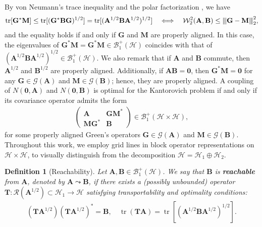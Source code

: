 \documentclass[noinfoline]{imsart}\setcounter{tocdepth}{2}
\newcommand{\m}[1]{\mathbf{#1}}
\renewcommand{\c}[1]{\mathcal{#1}}
\DeclareMathOperator{\tr}{tr}
\newcommand{\vertii}[1]{{\vert\kern-0.25ex\vert\kern-0.25ex\vert #1 
    \vert\kern-0.25ex\vert\kern-0.25ex\vert}} %
\theoremstyle{plain}
\newtheorem{definition}{Definition}[section]
\begin{document}
By von Neumann's trace inequality and the polar factorization \cite{conway2019course}, we have
\begin{align}\label{eq:W2:bdd:HS}
    \tr [\m{G}^{*} \m{M}] \le \tr [(\m{G}^{*} \m{B} \m{G})^{1/2}] = \tr [(\m{A}^{1/2} \m{B} \m{A}^{1/2})^{1/2}] \quad \Longleftrightarrow \quad \c{W}_{2}^{2}(\m{A}, \m{B}) \le \vertii{\m{G} - \m{M}}_{2}^{2},
\end{align}
and the equality holds if and only if $\m{G}$ and $\m{M}$ are properly aligned. In this case, the eigenvalues of $\m{G}^{*} \m{M} = \m{G}^{*} \m{M} \in \c{B}_{1}^{+}(\c{H})$ coincides with that of  $(\m{A}^{1/2} \m{B} \m{A}^{1/2})^{1/2}  \in \c{B}_{1}^{+}(\c{H})$.
We also remark that if $\m{A}$ and $\m{B}$ commute, then $\m{A}^{1/2}$ and $\m{B}^{1/2}$ are properly aligned. Additionally, if $\m{A} \m{B} = \m{0}$, then $\m{G}^{*} \m{M} = \m{0}$ for any $\m{G} \in \c{G}(\m{A})$ and $\m{M} \in \c{G}(\m{B})$; hence, they are properly aligned. 
A coupling of $N(\m{0}, \m{A})$ and $N(\m{0}, \m{B})$ is optimal for the Kantorovich problem if and only if its covariance operator admits the form
\begin{align}\label{eq:Kanto:block}
    \left(
    \begin{array}{c|c}
    \m{A} & \m{G} \m{M}^{*} \\
    \hline
    \m{M} \m{G}^{*} & \m{B}
    \end{array}
    \right) \in \c{B}_{1}^{+}(\c{H} \times \c{H}),
\end{align}
for some properly aligned Green's operators $\m{G} \in \c{G}(\m{A})$ and $\m{M} \in \c{G}(\m{B})$. Throughout this work, we employ grid lines in block operator representations on $\c{H} \times \c{H}$, to visually distinguish from the decomposition $\c{H} = \c{H}_{1} \oplus \c{H}_{2}$.


\begin{definition}[Reachability]
Let $\m{A}, \m{B} \in \c{B}_{1}^{+}(\c{H})$. We say that $\m{B}$ is \textbf{reachable} from $\m{A}$, denoted by $\m{A} \leadsto \m{B}$, if there exists a (possibly unbounded) operator $\m{T}: \c{R}(\m{A}^{1/2}) \subset \c{H}_{1} \rightarrow \c{H}$ satisfying transportability and optimality conditions:
\begin{align*}
    (\m{T} \m{A}^{1/2}) (\m{T} \m{A}^{1/2})^{*} = \m{B}, \quad \tr (\m{T} \m{A}) = \tr [(\m{A}^{1/2} \m{B} \m{A}^{1/2})^{1/2}].
\end{align*}
\end{definition}
\end{document}
